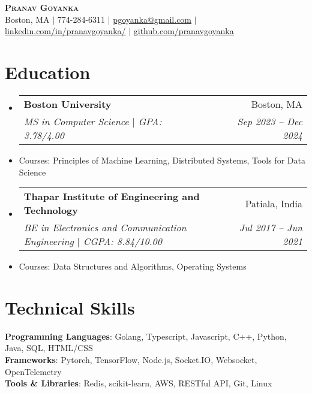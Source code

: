 \documentclass[letterpaper,11pt]{article}
\makeatletter
\newcommand{\resumeItem}[1]{
  \item\small{
    {#1 \vspace{-2pt}}
  }
}
\newcommand{\resumeSubheading}[4]{
  \vspace{-2pt}\item
    \begin{tabular*}{0.97\textwidth}[t]{l@{\extracolsep{\fill}}r}
      \textbf{#1} & #2 \\
      \textit{\small#3} & \textit{\small #4} \\
    \end{tabular*}\vspace{-7pt}
}
\newcommand{\resumeSubHeadingListStart}{\begin{itemize}[leftmargin=0.15in, label={}]}
\newcommand{\resumeSubHeadingListEnd}{\end{itemize}}
\makeatother
\begin{document}

\begin{center}
    \textbf{\Huge \scshape Pranav Goyanka} \\ \vspace{1pt}
    \small Boston, MA $|$
    \small 774-284-6311 $|$ \href{mailto:pgoyanka@gmail.com}{\underline{pgoyanka@gmail.com}} $|$ 
    \href{https://www.linkedin.com/in/pranavgoyanka/}{\underline{linkedin.com/in/pranavgoyanka/}} $|$
    \href{https://github.com/pranavgoyanka/}{\underline{github.com/pranavgoyanka}}
\end{center}

\section{Education}
  \resumeSubHeadingListStart
    \resumeSubheading
      {Boston University}{Boston, MA}
      {MS in Computer Science $|$ GPA: 3.78/4.00 }{Sep 2023 -- Dec 2024}
      \resumeItem{Courses: Principles of Machine Learning, Distributed Systems, Tools for Data Science}
    \resumeSubheading
      {Thapar Institute of Engineering and Technology}{Patiala, India}
      {BE in Electronics and Communication Engineering $|$ CGPA: 8.84/10.00 }{Jul 2017 -- Jun 2021}
      \resumeItem{Courses: Data Structures and Algorithms, Operating Systems}
  \resumeSubHeadingListEnd

\section{Technical Skills}
 \begin{itemize}[leftmargin=0.15in, label={}]
    \small{\item{
     \textbf{Programming Languages}{: Golang, Typescript, Javascript, C++, Python, Java,  SQL, HTML/CSS} \\
     \textbf{Frameworks}{: Pytorch, TensorFlow, Node.js, Socket.IO, Websocket, OpenTelemetry } \\
     \textbf{Tools \& Libraries}{: Redis, scikit-learn, AWS, RESTful API, Git, Linux} \\
    }}
 \end{itemize}
\end{document}
